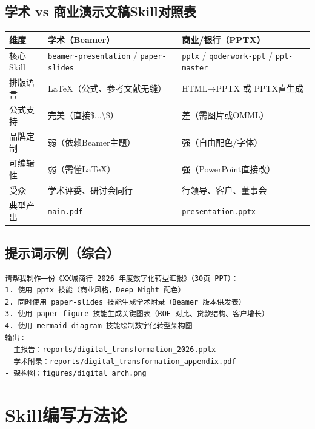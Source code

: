 \subsection{学术 vs 商业演示文稿Skill对照表}

\begin{table}[H]
\centering
\begin{tabular}{lll}
\toprule
\textbf{维度} & \textbf{学术（Beamer）} & \textbf{商业/银行（PPTX）} \\
\midrule
核心Skill & \texttt{beamer-presentation} / \texttt{paper-slides} & \texttt{pptx} / \texttt{qoderwork-ppt} / \texttt{ppt-master} \\
排版语言 & LaTeX（公式、参考文献无缝） & HTML→PPTX 或 PPTX直生成 \\
公式支持 & 完美（直接\$...\textbackslash\$） & 差（需图片或OMML） \\
品牌定制 & 弱（依赖Beamer主题） & 强（自由配色/字体） \\
可编辑性 & 弱（需懂LaTeX） & 强（PowerPoint直接改） \\
受众 & 学术评委、研讨会同行 & 行领导、客户、董事会 \\
典型产出 & \texttt{main.pdf} & \texttt{presentation.pptx} \\
\bottomrule
\end{tabular}
\end{table}

\subsection{提示词示例（综合）}

\begin{lstlisting}
请帮我制作一份《XX城商行 2026 年度数字化转型汇报》（30页 PPT）：
1. 使用 pptx 技能（商业风格，Deep Night 配色）
2. 同时使用 paper-slides 技能生成学术附录（Beamer 版本供发表）
3. 使用 paper-figure 技能生成关键图表（ROE 对比、贷款结构、客户增长）
4. 使用 mermaid-diagram 技能绘制数字化转型架构图
输出：
- 主报告：reports/digital_transformation_2026.pptx
- 学术附录：reports/digital_transformation_appendix.pdf
- 架构图：figures/digital_arch.png
\end{lstlisting}

\section{Skill编写方法论}

